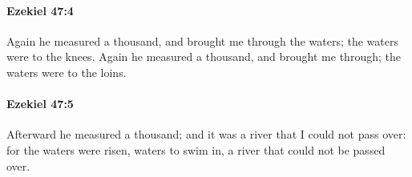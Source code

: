 		\paragraph{Ezekiel 47:4} %
			\label{EZEKIEL-47-4}

			Again he measured a thousand, and brought me through the waters; the waters were to the knees. Again he measured a thousand, and brought me through; the waters were to the loins.


		\paragraph{Ezekiel 47:5} %
			\label{EZEKIEL-47-5}

			Afterward he measured a thousand; and it was a river that I could not pass over: for the waters were risen, waters to swim in, a river that could not be passed over.


